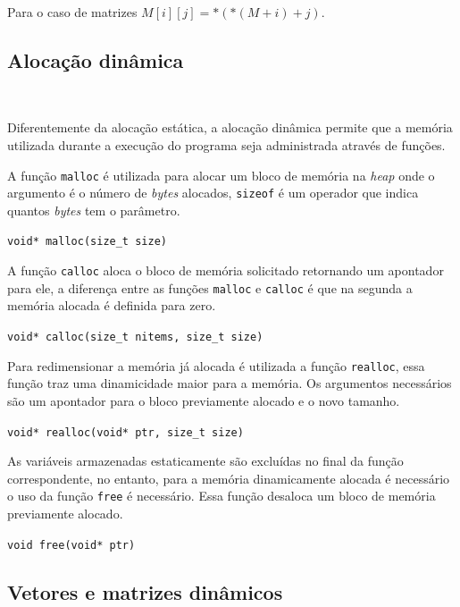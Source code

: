 Para o caso de matrizes $M[i][j]=*(*(M+i)+j)$.

\subsection*{Alocação dinâmica}
\

Diferentemente da alocação estática, a alocação dinâmica permite que a memória utilizada durante a execução do programa seja administrada através de funções.

A função \texttt{malloc} é utilizada para alocar um bloco de memória na \textit{heap} onde o argumento é o número de \textit{bytes} alocados, \texttt{sizeof} é um operador que indica quantos \textit{bytes} tem o parâmetro.

\begin{center}
\texttt{void* malloc(size\_t size)}
\end{center}

A função \texttt{calloc} aloca o bloco de memória solicitado retornando um apontador para ele, a diferença entre as funções \texttt{malloc} e \texttt{calloc} é que na segunda a memória alocada é definida para zero.

\begin{center}
\texttt{void* calloc(size\_t nitems, size\_t size)}
\end{center}

Para redimensionar a memória já alocada é utilizada a função \texttt{realloc}, essa função traz uma dinamicidade maior para a memória. Os argumentos necessários são um apontador para o bloco previamente alocado e o novo tamanho.

\begin{center}
\texttt{void* realloc(void* ptr, size\_t size)}
\end{center}

As variáveis armazenadas estaticamente são excluídas no final da função correspondente, no entanto, para a memória dinamicamente alocada é necessário o uso da função \texttt{free} é necessário. Essa função desaloca um bloco de memória previamente alocado.

\begin{center}
\texttt{void free(void* ptr)}
\end{center}

\subsection*{Vetores e matrizes dinâmicos}
\

